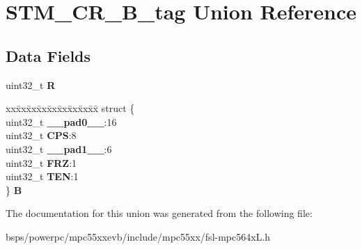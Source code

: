 \hypertarget{unionSTM__CR__32B__tag}{}\section{S\+T\+M\+\_\+\+C\+R\+\_\+B\+\_\+tag Union Reference}
\label{unionSTM__CR__32B__tag}
\subsection*{Data Fields}
\begin{DoxyCompactItemize}
\item 
\mbox{\label{unionSTM__CR__32B__tag_a49923a439eb7bfefbe0056dfa6275e35}} 
uint32\+\_\+t {\bfseries R}
\item 
\mbox{\label{unionSTM__CR__32B__tag_a951438d585c7b4615f38a6e3fca50ca4}} 
\begin{tabbing}
xx\=xx\=xx\=xx\=xx\=xx\=xx\=xx\=xx\=\kill
struct \{\\
\>uint32\_t {\bfseries \_\_pad0\_\_}:16\\
\>uint32\_t {\bfseries CPS}:8\\
\>uint32\_t {\bfseries \_\_pad1\_\_}:6\\
\>uint32\_t {\bfseries FRZ}:1\\
\>uint32\_t {\bfseries TEN}:1\\
\} {\bfseries B}\\

\end{tabbing}\end{DoxyCompactItemize}


The documentation for this union was generated from the following file\+:\begin{DoxyCompactItemize}
\item 
bsps/powerpc/mpc55xxevb/include/mpc55xx/fsl-\/mpc564x\+L.\+h\end{DoxyCompactItemize}
